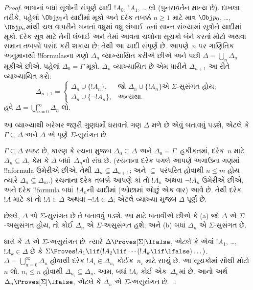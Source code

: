\documentclass[../../../include/open-logic-section]{subfiles}
\begin{document}
\begin{proof}
ભાષાનાં બધાં સૂત્રોની સંપૂર્ણ યાદી $!A_0$, $!A_1$, \dots{} લો
(પુનરાવર્તન માન્ય છે). દાખલા તરીકે, પહેલાં $\Obj p_0$ને યાદીમાં
મૂકો અને દરેક તબક્કે $n \ge 1$ માટે માત્ર $\Obj p_0$,
\dots,~$\Obj p_n$માંથી ચલ વાપરીને બનતાં વધુમાં વધુ લંબાઈ~$n$નાં
સાન્ત સંખ્યામાં સૂત્રોને યાદીમાં મૂકો. દરેક સૂત્ર માટે તેની લંબાઈ
અને તેમાં આવતા ચલોના સૂચકો બંને કરતાં મોટો અથવા સમાન તબક્કો
પસંદ કરી શકાય છે; તેથી આ યાદી સંપૂર્ણ છે.
આપણે~$n$ પર ગાણિતિક અનુમાનથી !!{formula}sના
ગણો $\Delta_n$ વ્યાખ્યાયિત કરીએ છીએ અને પછી $\Delta = \bigcup_n
\Delta_n$ મૂકીએ છીએ. પહેલાં $\Delta_0 = \Gamma$ મૂકો. $\Delta_n$
વ્યાખ્યાયિત છે એમ ધારીને $\Delta_{n+1}$ આ રીતે વ્યાખ્યાયિત કરો:
\[
\Delta_{n+1} =
\begin{cases}
  \Delta_n \cup \{!A_n\}, & \text{જો $\Delta_n \cup \{ !A_n\}$
    એ $\Sigma$-સુસંગત હોય;} \\
  \Delta_n \cup \{ \lnot !A_n\}, & \text{અન્યથા.}
\end{cases}
\]
હવે $\Delta = \bigcup_{n=0}^\infty \Delta_n$ લો.

આ વ્યાખ્યાથી ખરેખર જરૂરી ગુણધર્મો ધરાવતો ગણ $\Delta$ મળે છે એવું
બતાવવું પડશે, એટલે કે $\Gamma \subseteq \Delta$ અને $\Delta$ એ
પૂર્ણ $\Sigma$-સુસંગત છે.

$\Gamma \subseteq \Delta$ સ્પષ્ટ છે, કારણ કે રચના મુજબ $\Delta_0
\subseteq \Delta$ અને $\Delta_0 = \Gamma$. હકીકતમાં, દરેક~$n$ માટે
$\Delta_n \subseteq \Delta$, કેમ કે $\Delta$ બધાં~$\Delta_n$નો સંઘ
છે. (રચનાના દરેક પગલે આપણે અગાઉના ગણમાં !!a{formula} ઉમેરીએ છીએ,
તેથી $\Delta_n \subseteq \Delta_{n+1}$; અને $\subseteq$ પરંપરિત
હોવાથી $n \le m$ હોય ત્યારે $\Delta_n \subseteq \Delta_{m}$.)
રચનાના દરેક તબક્કે આપણે કાં તો $!A_n$ અથવા $\lnot !A_n$ ઉમેરીએ
છીએ, અને દરેક !!{formula} બધાં~$!A_n$ની યાદીમાં (ઓછામાં ઓછું એક વાર)
આવે છે. તેથી દરેક $!A$ માટે કાં તો $!A \in \Delta$ અથવા
$\lnot !A \in \Delta$; એટલે વ્યાખ્યા મુજબ $\Delta$ પૂર્ણ છે.

છેલ્લે, $\Delta$ એ $\Sigma$-સુસંગત છે તે બતાવવું પડશે. આ માટે
બતાવીએ છીએ કે (a) જો $\Delta$ એ $\Sigma$-અસુસંગત હોય, તો કોઈ
$\Delta_n$ એ $\Sigma$-અસુસંગત હશે; અને (b) બધાં $\Delta_n$ એ
$\Sigma$-સુસંગત છે.

ધારો કે $\Delta$ એ $\Sigma$-અસુસંગત છે. ત્યારે $\Delta
\Proves[\Sigma] \lfalse$, એટલે કે એવાં $!A_1$, \dots,~$!A_k \in
\Delta$ છે કે $\Sigma \Proves !A_1 \lif (!A_2 \lif \cdots (!A_k
\lif \lfalse)\dots)$. $\Delta = \bigcup_{n=0}^\infty \Delta_n$
હોવાથી દરેક $!A_i \in \Delta_{n_i}$ કોઈક~$n_i$ માટે સાચું છે.
આ સૂચકોમાં સૌથી મોટો $n$ લો. $n_i \le n$ હોવાથી $\Delta_{n_i}
\subseteq \Delta_n$. આમ, બધાં $!A_i$ કોઈ એક~$\Delta_n$માં છે.
આનો અર્થ $\Delta_n \Proves[\Sigma] \lfalse$, એટલે કે $\Delta_n$
એ $\Sigma$-અસુસંગત છે.


\end{proof}
\end{document}
